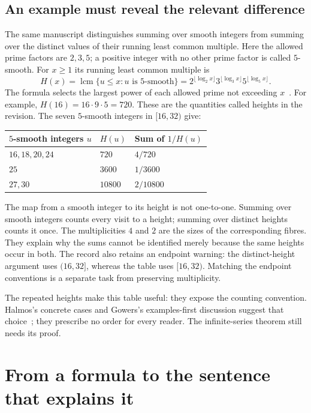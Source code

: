 \subsection{An example must reveal the relevant difference}\label{sec:multiplicity}

The same manuscript distinguishes summing over smooth integers from summing
over the distinct values of their running least common multiple. Here the
allowed prime factors are $2,3,5$; a positive integer with no other prime
factor is called $5$-smooth. For $x\ge1$ its running least common multiple is
\[
 H(x)=\operatorname{lcm}\{u\le x:u\text{ is }5\text{-smooth}\}
     =2^{\lfloor\log_2x\rfloor}
      3^{\lfloor\log_3x\rfloor}
      5^{\lfloor\log_5x\rfloor}.
\]
The formula selects the largest power of each allowed prime not exceeding
$x$~\cite[definition of running least common multiples]{paper269}. For example,
$H(16)=16\cdot9\cdot5=720$. These are the quantities called heights in the
revision. The seven $5$-smooth integers in $[16,32)$ give:
\begin{center}
\begin{tabular}{@{}lll@{}}
\toprule
$5$-smooth integers $u$ & $H(u)$ & Sum of $1/H(u)$\\
\midrule
$16,18,20,24$ & $720$ & $4/720$\\
$25$ & $3600$ & $1/3600$\\
$27,30$ & $10800$ & $2/10800$\\
\bottomrule
\end{tabular}
\end{center}
The map from a smooth integer to its height is not one-to-one. Summing over
smooth integers counts every visit to a height; summing over distinct heights
counts it once. The multiplicities $4$ and $2$ are the sizes of the corresponding
fibres. They explain why the sums cannot be identified merely because the
same heights occur in both.
The record  also retains an endpoint warning:
the distinct-height argument uses $(16,32]$, whereas the table uses
$[16,32)$. Matching the endpoint conventions is a separate task from
preserving multiplicity.

The repeated heights make this table useful: they expose the counting
convention. Halmos's concrete cases and Gowers's examples-first discussion
suggest that choice~\cite[\S4]{halmos}\cite{gowers}; they prescribe no order
for every reader. The infinite-series theorem still needs its proof.


\section{From a formula to the sentence that explains it}\label{sec:worked-explanations}

